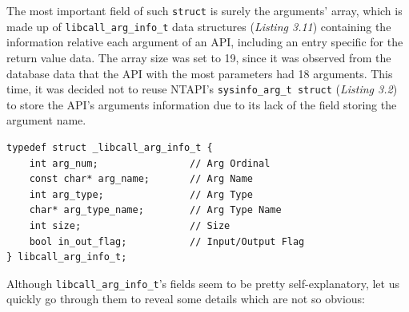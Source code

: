 The most important field of such \texttt{struct} is surely the arguments' array, which is made up of \texttt{libcall\_arg\_info\_t} data structures (\textit{Listing 3.11}) containing the information relative each argument of an API, including an entry specific for the return value data. The array size was set to 19, since it was observed from the database data that the API with the most parameters had 18 arguments. This time, it was decided not to reuse NTAPI's \texttt{sysinfo\_arg\_t struct} (\textit{Listing 3.2}) to store the API's arguments information due to its lack of the field storing the argument name. 
\\
\begin{lstlisting}[caption={\texttt{struct} containing information associated to an API argument},captionpos=b]
typedef struct _libcall_arg_info_t {
	int arg_num;				// Arg Ordinal
	const char* arg_name;		// Arg Name
	int arg_type;             	// Arg Type
	char* arg_type_name;		// Arg Type Name
	int size;					// Size
	bool in_out_flag;			// Input/Output Flag
} libcall_arg_info_t;
\end{lstlisting}   

Although \texttt{libcall\_arg\_info\_t}'s fields seem to be pretty self-explanatory, let us quickly go through them to reveal some details which are not so obvious:

